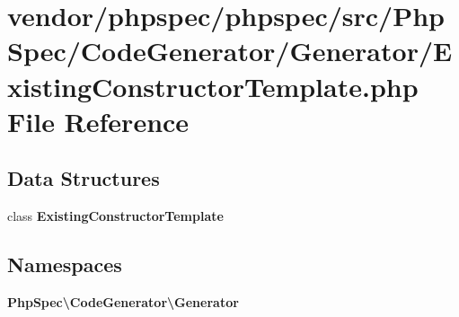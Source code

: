 \section{vendor/phpspec/phpspec/src/\+Php\+Spec/\+Code\+Generator/\+Generator/\+Existing\+Constructor\+Template.php File Reference}
\label{_existing_constructor_template_8php}
\subsection*{Data Structures}
\begin{DoxyCompactItemize}
\item 
class {\bf Existing\+Constructor\+Template}
\end{DoxyCompactItemize}
\subsection*{Namespaces}
\begin{DoxyCompactItemize}
\item 
 {\bf Php\+Spec\textbackslash{}\+Code\+Generator\textbackslash{}\+Generator}
\end{DoxyCompactItemize}
